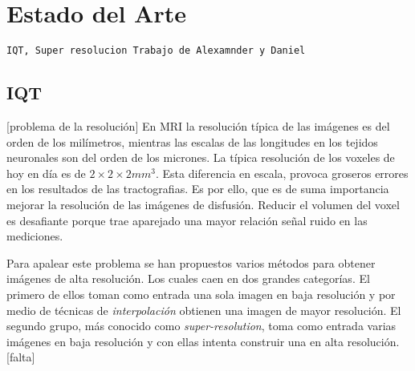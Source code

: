 \chapter{Estado del Arte}

\begin{verbatim}
IQT, Super resolucion Trabajo de Alexamnder y Daniel 
\end{verbatim}


\section{IQT}
[problema de la resoluci\'on]
En MRI la resoluci\'on t\'ipica de las im\'agenes es del orden de los mil\'imetros, mientras las 
escalas de las longitudes en los tejidos neuronales son del orden de los micrones. La t\'ipica 
resoluci\'on de los voxeles de hoy en d\'ia es de $2\times2\times2 mm^3$. Esta diferencia en 
escala, provoca groseros errores en los resultados de las tractografias. Es por ello, que es de 
suma importancia mejorar la resoluci\'on de las im\'agenes de disfusi\'on. Reducir el volumen del 
voxel es desafiante porque trae aparejado una mayor relaci\'on se\~nal ruido en las mediciones. 

Para apalear este problema se han propuestos varios m\'etodos para obtener im\'agenes de alta 
resoluci\'on. Los cuales caen en dos grandes categor\'ias. El primero de ellos toman como 
entrada una sola imagen en baja resoluci\'on y por medio de t\'ecnicas de 
\textit{interpolaci\'on} obtienen una imagen de mayor resoluci\'on. El segundo grupo, m\'as 
conocido como \textit{super-resolution}, toma como entrada varias im\'agenes en baja resoluci\'on y 
con ellas intenta construir una en alta resoluci\'on. [falta]
